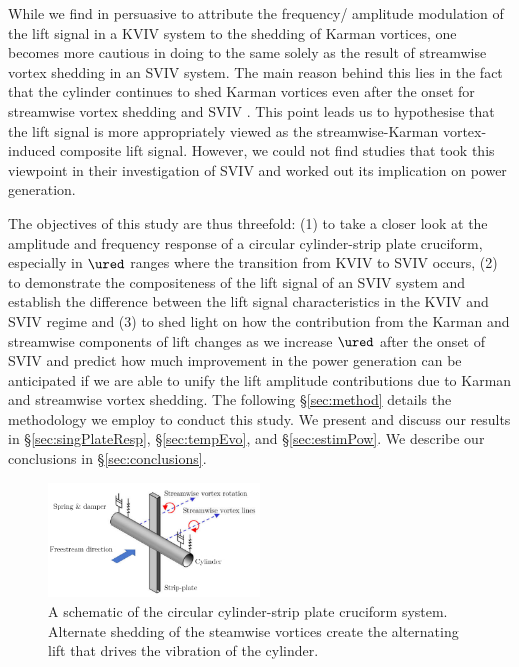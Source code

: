 \documentclass[a4paper,fleqn]{cas-sc}
\begin{document}
While we find in persuasive to attribute the frequency/ amplitude modulation of the lift signal in a KVIV system to the shedding of Karman vortices, one becomes more cautious in doing to the same solely as the result of streamwise vortex shedding in an SVIV system. The main reason behind this lies in the fact that the cylinder continues to shed Karman vortices even after the onset for streamwise vortex shedding and SVIV \citep{Shirakashi1989}. This point leads us to hypothesise that the lift signal is more appropriately viewed as the streamwise-Karman vortex-induced composite lift signal. However, we could not find studies that took this viewpoint in their investigation of SVIV and worked out its implication on power generation.

The objectives of this study are thus threefold: (1) to take a closer look at the amplitude and frequency response of a circular cylinder-strip plate cruciform, especially in $\ured$ ranges where the transition from KVIV to SVIV occurs, (2) to demonstrate the compositeness of the lift signal of an SVIV system and establish the difference between the lift signal characteristics in the KVIV and SVIV regime and (3) to shed light on how the contribution from the Karman and streamwise components of lift changes as we increase $\ured$ after the onset of SVIV and predict how much improvement in the power generation can be anticipated if we are able to unify the lift amplitude contributions due to Karman and streamwise vortex shedding. The following \S\ref{sec:method} details the methodology we employ to conduct this study. We present and discuss our results in \S\ref{sec:singPlateResp}, \S\ref{sec:tempEvo}, and \S\ref{sec:estimPow}. We describe our conclusions in \S\ref{sec:conclusions}.

\begin{figure}
  \centering
  \includegraphics[width=0.5\textwidth]{figs/figure1}
  \caption{A schematic of the circular cylinder-strip plate cruciform system. Alternate shedding of the steamwise vortices create the alternating lift that drives the vibration of the cylinder.}
  \label{fig:cruciformSystemSchematic}
\end{figure}
\end{document}
